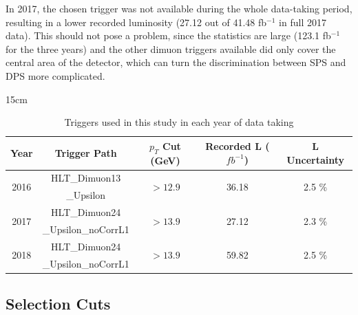 In 2017, the chosen trigger was not available during the whole data-taking period, resulting in a lower recorded luminosity (27.12 out of 41.48 fb$^{-1}$ in full 2017 data). This should not pose a problem, since the statistics are large (123.1 fb$^{-1}$ for the three years) and the other dimuon triggers available did only cover the central area of the detector, which can turn the discrimination between SPS and DPS more complicated.

\begin{table}[!htbp]{15cm}
  \caption{Triggers used in this study in each year of data taking}
  \begin{tabular}{ c | c | c | c | c }
    Year                     & Trigger Path        & $p_T$ Cut (GeV)             & Recorded L ($fb^{-1}$)    & L Uncertainty              \\  \hline
    \multirow[c]{2}{*}{2016} & HLT\_Dimuon13       & \multirow[c]{2}{*}{$>12.9$} & \multirow[c]{2}{*}{36.18} & \multirow[c]{2}{*}{2.5 \%} \\
                             & \_Upsilon           &                             &                                                        \\ \hline
    \multirow[c]{2}{*}{2017} & HLT\_Dimuon24       & \multirow[c]{2}{*}{$>13.9$} & \multirow[c]{2}{*}{27.12} & \multirow[c]{2}{*}{2.3 \%} \\
                             & \_Upsilon\_noCorrL1 &                             &                           &                            \\ \hline
    \multirow[c]{2}{*}{2018} & HLT\_Dimuon24       & \multirow[c]{2}{*}{$>13.9$} & \multirow[c]{2}{*}{59.82} & \multirow[c]{2}{*}{2.5 \%} \\
                             & \_Upsilon\_noCorrL1 &                             &                           &                            \\ \hline
  \end{tabular}
  \label{tab:triggers}
\end{table}

\subsection{Selection Cuts} \label{sec:selcuts}

